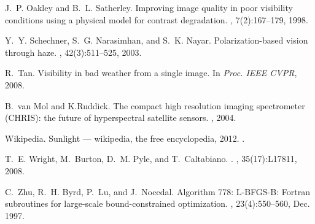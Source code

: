\documentclass[10pt,twocolumn,letterpaper]{article}
\begin{document}
{\begin{thebibliography}{10}
J.~P. Oakley and B.~L. Satherley.
\newblock Improving image quality in poor visibility conditions using a
  physical model for contrast degradation.
, 7(2):167--179, 1998.

Y.~Y. Schechner, S.~G. Narasimhan, and S.~K. Nayar.
\newblock Polarization-based vision through haze.
, 42(3):511--525, 2003.

R.~Tan.
\newblock Visibility in bad weather from a single image.
\newblock In {\em Proc. IEEE CVPR}, 2008.

B.~van Mol and K.Ruddick.
\newblock The compact high resolution imaging spectrometer (CHRIS): the future
  of hyperspectral satellite sensors.
, 2004.

Wikipedia.
\newblock Sunlight --- wikipedia{,} the free encyclopedia, 2012.
.

T.~E. Wright, M.~Burton, D.~M. Pyle, and T.~Caltabiano.
.
, 35(17):L17811, 2008.

C.~Zhu, R.~H. Byrd, P.~Lu, and J.~Nocedal.
\newblock Algorithm 778: L-BFGS-B: Fortran subroutines for large-scale
  bound-constrained optimization.
, 23(4):550--560, Dec. 1997.

\end{thebibliography}



}
\end{document}
